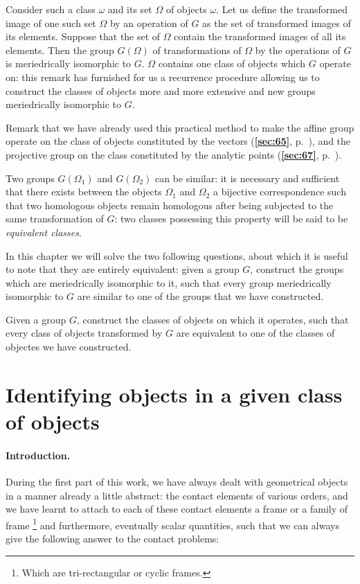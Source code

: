 \documentclass[leqno,11pt]{book}
\numberwithin{equation}{chapter}
\theoremstyle{shape1}
\theoremstyle{shapesmall}
\newcommand{\fsref}[1]{{\rm\textsection\textbf{\ref{sec:#1}}}}
\newcommand{\somespace}{\vspace{9pt}}
\begin{document}
Consider such a class $\omega$ and its set $\Omega$ of objects $\omega$. Let us define the transformed image of one such set $\Omega$ by an operation of $G$ as the set of transformed images of its elements. Suppose that the set of $\Omega$ contain the transformed images of all its elements. Then the group $G(\Omega)$ of transformations of $\Omega$ by the operations of $G$ is meriedrically isomorphic to $G$. $\Omega$ contains one class of objects which $G$ operate on: this remark has furnished for us a recurrence procedure allowing us to construct the classes of objects more and more extensive and new groups meriedrically isomorphic to $G$.

\somespace

{\small
Remark that we have already used this practical method to make the affine group operate on the class of objects constituted by the vectors (\fsref{65}, p.~\pageref{sec:65}), and the projective group on the class constituted by the analytic points (\fsref{67}, p.~\pageref{sec:67}).
}

\somespace

Two groups $G(\Omega_{1})$ and $G(\Omega_{2})$ can be similar: it is necessary and sufficient that there exists between the objects $\Omega_{1}$ and $\Omega_{2}$ a bijective correspondence such that two homologous objects remain homologous after being subjected to the same transformation of $G$: two classes possessing this property will be said to be \emph{equivalent classes}.

In this chapter we will solve the two following questions, about which it is useful to note that they are entirely equivalent: given a group $G$, construct the groups which are meriedrically isomorphic to it, such that every group meriedrically isomorphic to $G$ are similar to one of the groups that we have constructed.

Given a group $G$, construct the classes of objects on which it operates, such that every class of objects transformed by $G$ are equivalent to one of the classes of objectes we have constructed.


\section{Identifying objects in a given class of objects}
\label{sec:spott-objects-same}

\paragraph{Introduction.}
\label{sec:92}
During the first part of this work, we have always dealt with geometrical objects in a manner already a little abstract: the contact elements of various orders, and we have learnt to attach to each of these contact elements a frame or a family of frame \footnote{Which are tri-rectangular or cyclic frames.} and furthermore, eventually scalar quantities, such that we can always give the following answer to the contact problems:
\end{document}
